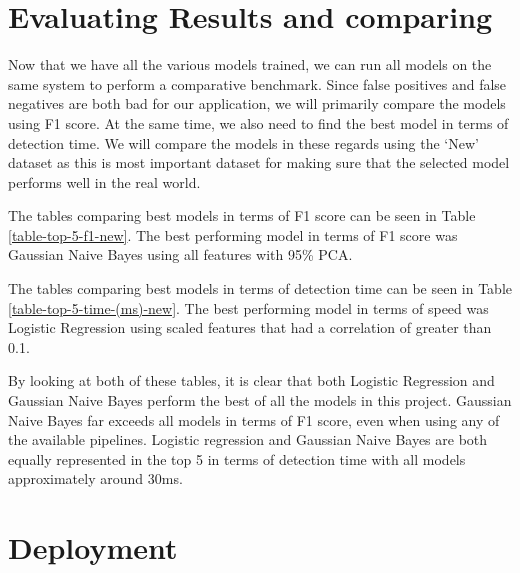 \section{Evaluating Results and comparing}

Now that we have all the various models trained, we can run all models on the same system to perform a comparative benchmark. Since false positives and false negatives are both bad for our application, we will primarily compare the models using F1 score. At the same time, we also need to find the best model in terms of detection time. We will compare the models in these regards using the `New' dataset as this is most important dataset for making sure that the selected model performs well in the real world.

The tables comparing best models in terms of F1 score can be seen in Table \ref{table-top-5-f1-new}. The best performing model in terms of F1 score was Gaussian Naive Bayes using all features with 95\% PCA.



The tables comparing best models in terms of detection time can be seen in Table \ref{table-top-5-time-(ms)-new}. The best performing model in terms of speed was Logistic Regression using scaled features that had a correlation of greater than 0.1.



By looking at both of these tables, it is clear that both Logistic Regression and Gaussian Naive Bayes perform the best of all the models in this project. Gaussian Naive Bayes far exceeds all models in terms of F1 score, even when using any of the available pipelines. Logistic regression and Gaussian Naive Bayes are both equally represented in the top 5 in terms of detection time with all models approximately around 30ms.


\section{Deployment}

